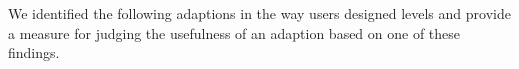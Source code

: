 We identified the following adaptions in the way users designed levels and provide a measure for judging the usefulness of an adaption based on one of these findings.









